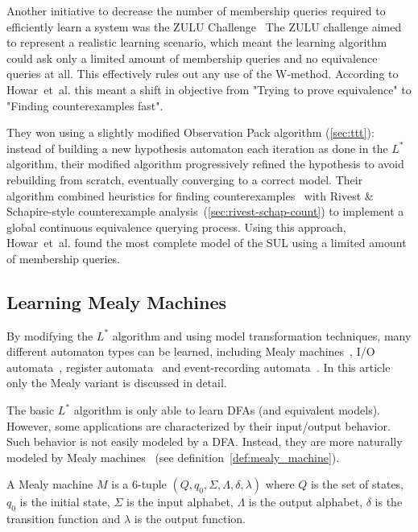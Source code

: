 Another initiative to decrease the number of membership queries required
to efficiently learn a system was the ZULU Challenge~\cite{Howar2010b}
The ZULU challenge aimed to represent a realistic learning scenario,
which meant the learning algorithm could ask only a limited amount of
membership queries and no equivalence queries at all.
This effectively rules out any use of the W-method.
According to Howar~et~al. this meant a shift in objective from
"Trying to prove equivalence" to "Finding counterexamples fast".

They won using a slightly modified Observation Pack algorithm (\cref{sec:ttt}):
instead of building a new hypothesis automaton each iteration as done
in the $L^*$ algorithm, their modified algorithm progressively refined
the hypothesis to avoid rebuilding from scratch,
eventually converging to a correct model.
Their algorithm combined heuristics for finding
counterexamples~\cite{Howar2010b} with Rivest \& Schapire-style counterexample
analysis~(\cref{sec:rivest-schap-count}) to implement a global continuous
equivalence querying process.
Using this approach, Howar~et~al. found the most complete
model of the SUL using a limited amount of membership queries.

\newpage
\subsection{Learning Mealy Machines}
\label{sec:learn-mealy-mach}

By modifying the $L^*$ algorithm and using model transformation techniques, many
different automaton types can be learned, including Mealy machines~\cite{Shahbaz2009}, I/O automata~\cite{Aarts2010a}, register automata~\cite{Howar2012} and event-recording automata~\cite{Grinchtein05}. In this
article only the Mealy variant is discussed in detail.

The basic $L^*$ algorithm is only able to learn DFAs (and equivalent
models). However, some applications are characterized by their input/output behavior.
Such behavior is not easily modeled by a DFA. Instead, they are more naturally
modeled by Mealy machines~\cite{Shahbaz2009} (see definition~\ref{def:mealy_machine}).

\begin{definition}\label{def:mealy_machine}
  A Mealy machine $M$ is a 6-tuple $(Q, q_0, \Sigma, \Lambda, \delta, \lambda)$
  where $Q$ is the set of states, $q_0$ is the initial state, $\Sigma$ is the
  input alphabet, $\Lambda$ is the output alphabet, $\delta$ is the transition
  function and $\lambda$ is the output function.
\end{definition}

